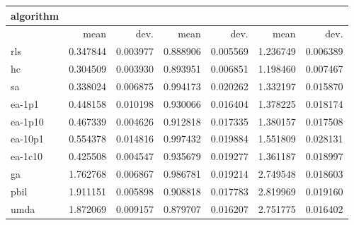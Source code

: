 \begin{tabular}{@{}l*{6}{>{{}}N{1}{2}}@{}}
\toprule
{algorithm} &  &  &  \\
\midrule
& {mean} & {dev.} & {mean} & {dev.} & {mean} & {dev.} \\
\midrule
rls & 0.347844 & 0.003977 & 0.888906 & 0.005569 & 1.236749 & 0.006389 \\
 hc & 0.304509 & 0.003930 & 0.893951 & 0.006851 & 1.198460 & 0.007467 \\
 sa & 0.338024 & 0.006875 & 0.994173 & 0.020262 & 1.332197 & 0.015870 \\
 ea-1p1 & 0.448158 & 0.010198 & 0.930066 & 0.016404 & 1.378225 & 0.018174 \\
 ea-1p10 & 0.467339 & 0.004626 & 0.912818 & 0.017335 & 1.380157 & 0.017508 \\
 ea-10p1 & 0.554378 & 0.014816 & 0.997432 & 0.019884 & 1.551809 & 0.028131 \\
 ea-1c10 & 0.425508 & 0.004547 & 0.935679 & 0.019277 & 1.361187 & 0.018997 \\
 ga & 1.762768 & 0.006867 & 0.986781 & 0.019214 & 2.749548 & 0.018603 \\
 pbil & 1.911151 & 0.005898 & 0.908818 & 0.017783 & 2.819969 & 0.019160 \\
 umda & 1.872069 & 0.009157 & 0.879707 & 0.016207 & 2.751775 & 0.016402 \\
 \bottomrule
\end{tabular}
